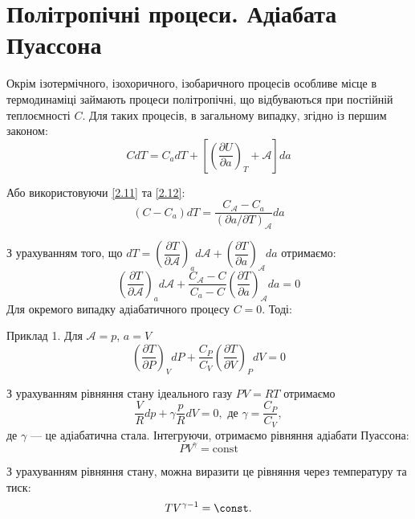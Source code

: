 \section{Політропічні процеси. Адіабата Пуассона}

Окрім ізотермічного, ізохоричного, ізобаричного процесів особливе місце в термодинаміці займають
процеси
політропічні, що відбуваються при постійній теплоємності $C$. Для таких процесів, в загальному
випадку, згідно із
першим законом:
\begin{equation}\label{2.27}
	CdT = C_a dT + \left[\left(\dfrac{\partial U}{\partial a}\right)_T + \mathcal{A}\right]da
\end{equation}

Або використовуючи  \eqref{2.11} та \eqref{2.12}:
\begin{equation}\label{2.28}
	(C-C_a) dT = \dfrac{C_{\mathcal{A}} - C_a}{(\partial a/\partial T)_{\mathcal{A}}}da
\end{equation}

З урахуванням того, що $dT = \left(\dfrac{\partial T}{\partial \mathcal{A}}\right)_a
	d\mathcal{A} +
	\left(\dfrac{\partial T}{\partial a}\right)_{\mathcal{A}} da$ отримаємо:
\begin{equation}\label{2.29}
	\left(\frac{\partial T}{\partial \mathcal{A}}\right)_a d\mathcal{A} +
	\frac{C_{\mathcal{A}} -
		C}{C_a -C}\left(\frac{\partial T}{\partial a}\right)_{\mathcal{A}} da =0
\end{equation}
Для окремого випадку адіабатичного процесу $C=0$. Тоді:

Приклад 1. Для $\mathcal{A} = p$, $a=V$
\begin{equation}\label{2.30}
	\left(\dfrac{\partial T}{\partial P}\right)_V dP+\dfrac{C_P}{C_V}\left(\dfrac{\partial T}{\partial
V}\right)_PdV=0
\end{equation}

З урахуванням рівняння стану ідеального газу $PV = RT$ отримаємо
\begin{equation*}
	\dfrac{V}{R} dp + \gamma \dfrac{p}{R}dV =0, \text{ де } \gamma = \dfrac{C_P}{C_V},
\end{equation*}
де $\gamma$ --- це адіабатична стала. Інтегруючи, отримаємо рівняння адіабати Пуассона:
\begin{equation}\label{2.31}
	PV^{\gamma} = \mathrm{const}
\end{equation}

З урахуванням рівняння стану, можна виразити це рівняння через температуру та тиск:
\begin{equation*}
	TV^{\gamma-1} = \const.
\end{equation*}

